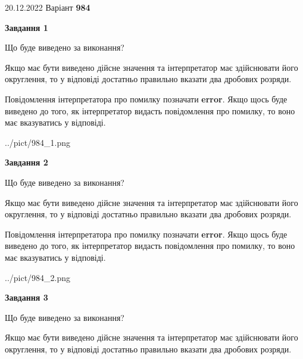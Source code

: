 \documentclass[12pt, ukrainian]{article}
\begin{document}
{20.12.2022 Варіант \No \textbf { 984 }\par}
{
\begin {Large}

{\begin {center}\textbf{Завдання 1}\end {center}}\par
Що буде виведено за виконання? \par

Якщо має бути виведено дійсне значення та інтерпретатор має здійснювати його округлення, 
то у відповіді достатньо правильно вказати два дробових розряди.

Повідомлення інтерпретатора про помилку позначати \textbf{error}.
Якщо щось буде виведено до того, як інтерпретатор видасть повідомлення про помилку, 
то воно має вказуватись у відповіді. \par

\begin{center}
	{../pict/984_1.png}
\end{center}
\newpage

{\begin {center}\textbf{Завдання 2}\end {center}}\par
Що буде виведено за виконання? \par

Якщо має бути виведено дійсне значення та інтерпретатор має здійснювати його округлення, 
то у відповіді достатньо правильно вказати два дробових розряди.

Повідомлення інтерпретатора про помилку позначати \textbf{error}.
Якщо щось буде виведено до того, як інтерпретатор видасть повідомлення про помилку, 
то воно має вказуватись у відповіді. \par

\begin{center}
	{../pict/984_2.png}
\end{center}
\newpage

{\begin {center}\textbf{Завдання 3}\end {center}}\par
Що буде виведено за виконання? \par

Якщо має бути виведено дійсне значення та інтерпретатор має здійснювати його округлення, 
то у відповіді достатньо правильно вказати два дробових розряди.


\end{Large}}
\end{document}
